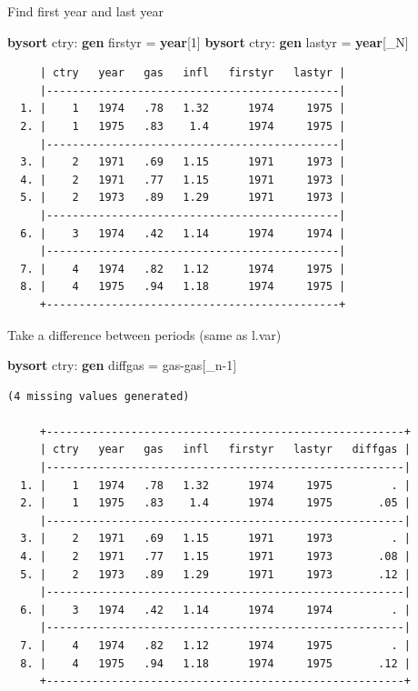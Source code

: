 \documentclass[
]{book}
\newenvironment{Shaded}{\begin{snugshade}}{\end{snugshade}}
\newcommand{\DataTypeTok}[1]{\textcolor[rgb]{0.13,0.29,0.53}{#1}}
\newcommand{\FunctionTok}[1]{\textcolor[rgb]{0.13,0.29,0.53}{\textbf{#1}}}
\newcommand{\KeywordTok}[1]{\textcolor[rgb]{0.13,0.29,0.53}{\textbf{#1}}}
\newcommand{\NormalTok}[1]{#1}
\begin{document}
Find first year and last year

\begin{Shaded}
\begin{Highlighting}[]
\KeywordTok{bysort}\NormalTok{ ctry: }\KeywordTok{gen}\NormalTok{ firstyr = }\FunctionTok{year}\NormalTok{[1]}
\KeywordTok{bysort}\NormalTok{ ctry: }\KeywordTok{gen}\NormalTok{ lastyr = }\FunctionTok{year}\NormalTok{[\_N]}
\end{Highlighting}
\end{Shaded}

\begin{verbatim}
     | ctry   year   gas   infl   firstyr   lastyr |
     |---------------------------------------------|
  1. |    1   1974   .78   1.32      1974     1975 |
  2. |    1   1975   .83    1.4      1974     1975 |
     |---------------------------------------------|
  3. |    2   1971   .69   1.15      1971     1973 |
  4. |    2   1971   .77   1.15      1971     1973 |
  5. |    2   1973   .89   1.29      1971     1973 |
     |---------------------------------------------|
  6. |    3   1974   .42   1.14      1974     1974 |
     |---------------------------------------------|
  7. |    4   1974   .82   1.12      1974     1975 |
  8. |    4   1975   .94   1.18      1974     1975 |
     +---------------------------------------------+
\end{verbatim}

Take a difference between periods (same as l.var)

\begin{Shaded}
\begin{Highlighting}[]
\KeywordTok{bysort}\NormalTok{ ctry: }\KeywordTok{gen}\NormalTok{ diffgas = gas{-}gas[}\DataTypeTok{\_n}\NormalTok{{-}1]}
\end{Highlighting}
\end{Shaded}

\begin{verbatim}
(4 missing values generated)

     +-------------------------------------------------------+
     | ctry   year   gas   infl   firstyr   lastyr   diffgas |
     |-------------------------------------------------------|
  1. |    1   1974   .78   1.32      1974     1975         . |
  2. |    1   1975   .83    1.4      1974     1975       .05 |
     |-------------------------------------------------------|
  3. |    2   1971   .69   1.15      1971     1973         . |
  4. |    2   1971   .77   1.15      1971     1973       .08 |
  5. |    2   1973   .89   1.29      1971     1973       .12 |
     |-------------------------------------------------------|
  6. |    3   1974   .42   1.14      1974     1974         . |
     |-------------------------------------------------------|
  7. |    4   1974   .82   1.12      1974     1975         . |
  8. |    4   1975   .94   1.18      1974     1975       .12 |
     +-------------------------------------------------------+
\end{verbatim}
\end{document}
